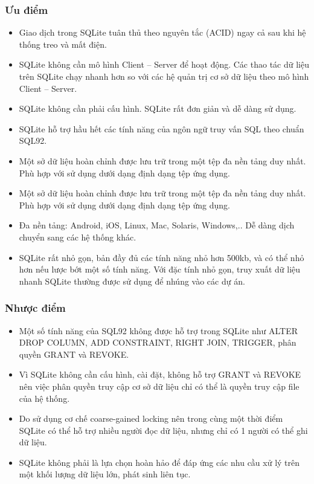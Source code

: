 \subsubsection{Ưu điểm}
\begin{itemize}
	\item Giao dịch trong SQLite tuân thủ theo nguyên tắc (ACID) ngay cả sau khi hệ thống treo và mất điện.
	\item SQLite không cần mô hình Client – Server để hoạt động. Các thao tác dữ liệu trên SQLite chạy nhanh hơn so với các hệ quản trị cơ sở dữ liệu theo mô hình Client – Server.
	\item SQLite không cần phải cấu hình. SQLite rất đơn giản và dễ dàng sử dụng.
	\item SQLite hỗ trợ hầu hết các tính năng của ngôn ngữ truy vấn SQL theo chuẩn SQL92.
	\item Một sở dữ liệu hoàn chỉnh được lưu trữ trong một tệp đa nền tảng duy nhất. Phù hợp với sử dụng dưới dạng định dạng tệp ứng dụng.
	\item Một sở dữ liệu hoàn chỉnh được lưu trữ trong một tệp đa nền tảng duy nhất. Phù hợp với sử dụng dưới dạng định dạng tệp ứng dụng.
	\item Đa nền tảng: Android, iOS, Linux, Mac, Solaris, Windows,.. Dễ dàng dịch chuyển sang các hệ thống khác.
	\item SQLite rất nhỏ gọn, bản đầy đủ các tính năng nhỏ hơn 500kb, và có thể nhỏ hơn nếu lược bớt một số tính năng. Với đặc tính nhỏ gọn, truy xuất dữ liệu nhanh SQLite thường được sử dụng để nhúng vào các dự án.
\end{itemize}
\subsubsection{Nhược điểm}
\begin{itemize}
	\item Một số tính năng của SQL92 không được hỗ trợ trong SQLite như ALTER DROP COLUMN, ADD CONSTRAINT, RIGHT JOIN, TRIGGER, phân quyền GRANT và REVOKE.
	\item Vì SQLite không cần cấu hình, cài đặt, không hỗ trợ GRANT và REVOKE nên việc phân quyền truy cập cơ sở dữ liệu chỉ có thể là quyền truy cập file của hệ thống.
	\item Do sử dụng cơ chế coarse-gained locking nên trong cùng một thời điểm SQLite có thể hỗ trợ nhiều người đọc dữ liệu, nhưng chỉ có 1 người có thể ghi dữ liệu.
	\item SQLite không phải là lựa chọn hoàn hảo để đáp ứng các nhu cầu xử lý trên một khối lượng dữ liệu lớn, phát sinh liên tục.
\end{itemize}
